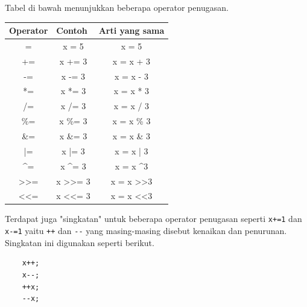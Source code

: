 Tabel di bawah menunjukkan beberapa operator penugasan.
\begin{center}
	\begin{tabular}{|c|c|c|}
		\hline
		\multicolumn{1}{|l|}{\textbf{Operator}} & \multicolumn{1}{l|}{\textbf{Contoh}} & \multicolumn{1}{l|}{\textbf{Arti yang sama}} \\ \hline
		=                                       & x = 5                                & x = 5                                        \\ \hline
		+=                                      & x += 3                               & x = x + 3                                    \\ \hline
		-=                                      & x -= 3                               & x = x - 3                                    \\ \hline
		*=                                      & x *= 3                               & x = x * 3                                    \\ \hline
		/=                                      & x /= 3                               & x = x / 3                                    \\ \hline
		\%=                                     & x \%= 3                              & x = x \% 3                                   \\ \hline
		\&=                                     & x \&= 3                              & x = x \& 3                                   \\ \hline
		|=                                      & x |= 3                               & x = x | 3                                    \\ \hline
		\textasciicircum{}=                     & x \textasciicircum{}= 3              & x = x \textasciicircum 3                     \\ \hline
		\textgreater{}\textgreater{}=           & x \textgreater{}\textgreater{}= 3    & x = x \textgreater{}\textgreater 3           \\ \hline
		\textless{}\textless{}=                 & x \textless{}\textless{}= 3          & x = x \textless{}\textless 3                 \\ \hline
	\end{tabular}
\end{center}
Terdapat juga "singkatan" untuk beberapa operator penugasan seperti \verb*|x+=1| dan \verb*|x-=1| yaitu \verb*|++| dan \verb*|--| yang masing-masing disebut kenaikan dan penurunan.
Singkatan ini digunakan seperti berikut.
\begin{verbatim}
    x++;
    x--;
    ++x;
    --x;
\end{verbatim}

